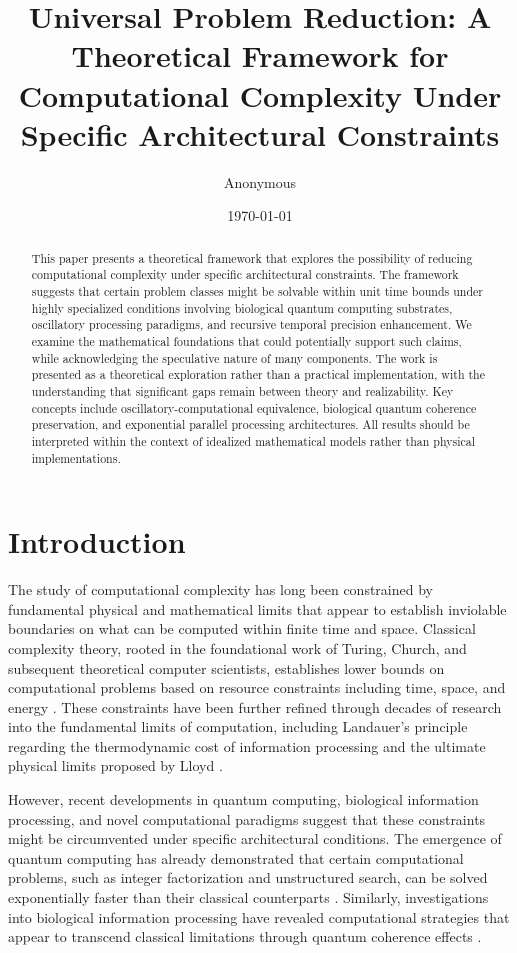 \documentclass[12pt,a4paper]{article}
\title{Universal Problem Reduction: A Theoretical Framework for Computational Complexity Under Specific Architectural Constraints}
\author{Anonymous}
\date{\today}
\theoremstyle{definition}
\begin{document}
\maketitle

\begin{abstract}
This paper presents a theoretical framework that explores the possibility of reducing computational complexity under specific architectural constraints. The framework suggests that certain problem classes might be solvable within unit time bounds under highly specialized conditions involving biological quantum computing substrates, oscillatory processing paradigms, and recursive temporal precision enhancement. We examine the mathematical foundations that could potentially support such claims, while acknowledging the speculative nature of many components. The work is presented as a theoretical exploration rather than a practical implementation, with the understanding that significant gaps remain between theory and realizability. Key concepts include oscillatory-computational equivalence, biological quantum coherence preservation, and exponential parallel processing architectures. All results should be interpreted within the context of idealized mathematical models rather than physical implementations.
\end{abstract}

\section{Introduction}

The study of computational complexity has long been constrained by fundamental physical and mathematical limits that appear to establish inviolable boundaries on what can be computed within finite time and space. Classical complexity theory, rooted in the foundational work of Turing, Church, and subsequent theoretical computer scientists, establishes lower bounds on computational problems based on resource constraints including time, space, and energy \cite{arora2009computational}. These constraints have been further refined through decades of research into the fundamental limits of computation, including Landauer's principle regarding the thermodynamic cost of information processing \cite{landauer1961irreversibility} and the ultimate physical limits proposed by Lloyd \cite{lloyd2000ultimate}.

However, recent developments in quantum computing, biological information processing, and novel computational paradigms suggest that these constraints might be circumvented under specific architectural conditions. The emergence of quantum computing has already demonstrated that certain computational problems, such as integer factorization and unstructured search, can be solved exponentially faster than their classical counterparts \cite{shor1994algorithms, grover1996fast}. Similarly, investigations into biological information processing have revealed computational strategies that appear to transcend classical limitations through quantum coherence effects \cite{lambert2013quantum, huelga2013vibrations}.
\end{document}
